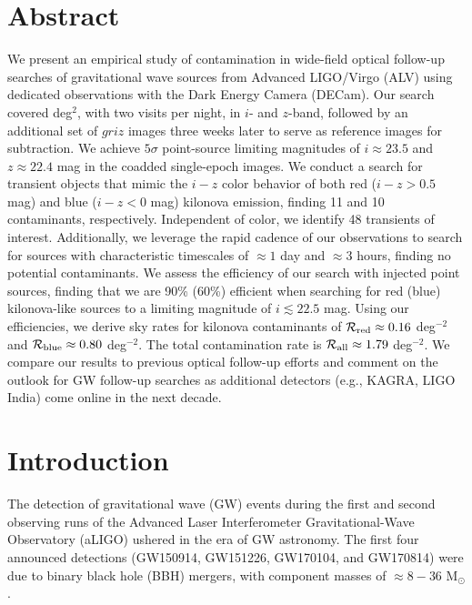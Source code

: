 \clearpage
\section*{Abstract}
We present an empirical study of contamination in wide-field optical follow-up searches of gravitational wave sources from Advanced LIGO/Virgo (ALV) using dedicated observations with the Dark Energy Camera (DECam). Our search covered  deg$^2$, with two visits per night, in $i$- and $z$-band, followed by an additional set of $griz$ images three weeks later to serve as reference images for subtraction. We achieve $5\sigma$ point-source limiting magnitudes of $i \approx 23.5$ and $z \approx 22.4$ mag in the coadded single-epoch images. We conduct a search for transient objects that mimic the $i-z$ color behavior of both red ($i-z > 0.5$ mag) and blue ($i-z < 0$ mag) kilonova emission, finding 11 and 10 contaminants, respectively. Independent of color, we identify 48 transients of interest. Additionally, we leverage the rapid cadence of our observations to search for sources with characteristic timescales of $\approx1$ day and $\approx3$ hours, finding no potential contaminants. We assess the efficiency of our search with injected point sources, finding that we are 90\% (60\%) efficient when searching for red (blue) kilonova-like sources to a limiting magnitude of $i \lesssim 22.5$ mag. Using our efficiencies, we derive sky rates for kilonova contaminants of $\mathcal{R}_{\rm red} \approx 0.16$ deg$^{-2}$ and $\mathcal{R}_{\rm blue} \approx 0.80$ deg$^{-2}$. The total contamination rate is $\mathcal{R}_{\rm all} \approx 1.79$ deg$^{-2}$. We compare our results to previous optical follow-up efforts and comment on the outlook for GW follow-up searches as additional detectors (e.g., KAGRA, LIGO India) come online in the next decade.

\section{Introduction}
\label{sec:ch3_intro}
The detection of gravitational wave (GW) events during the first and second observing runs of the Advanced Laser Interferometer Gravitational-Wave Observatory (aLIGO) ushered in the era of GW astronomy. The first four announced detections (GW150914, GW151226, GW170104, and GW170814) were due to binary black hole (BBH) mergers, with component masses of $\approx8-36$ M$_\odot$ \citep{LIGOGW150914,LIGOGW151226,LIGOGW170104,LIGOGW170814}.


